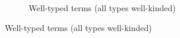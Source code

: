 \begin{figure}
\begin{subfigure}{\linewidth}
  \caption{Well-typed terms (all types well-kinded)}
\end{subfigure}
\label{fig:typing}
\end{figure}
